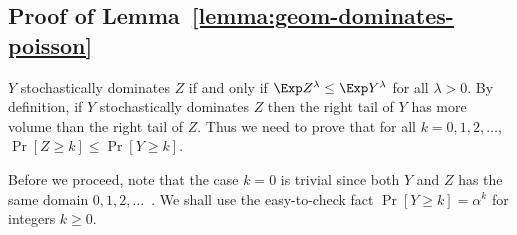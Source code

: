 \subsection{Proof of Lemma~\ref{lemma:geom-dominates-poisson}}



    $Y$ stochastically dominates $Z$ if and only if $\Exp Z^\lambda \leq \Exp Y^\lambda$ 
    for all $\lambda > 0$. 
    By definition, if $Y$ stochastically dominates $Z$ then the right tail of $Y$ 
    has more volume than the right tail of $Z$.
    Thus we need to prove that for all $k = 0, 1, 2, \ldots$, $\Pr[Z \geq k] \leq \Pr[Y \geq k]$.

    Before we proceed, note that the case $k = 0$ is trivial since 
    both $Y$ and $Z$ has the same domain $0, 1, 2, \ldots$\ . 
    We shall use the easy-to-check fact $\Pr[Y \geq k] = \alpha^k$ for integers $k \geq 0$. 

